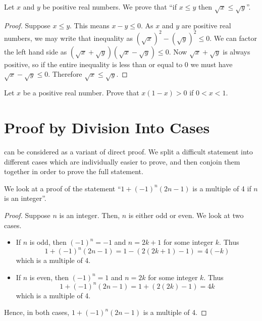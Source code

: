 \begin{example}
    Let $x$ and $y$ be positive real numbers. We prove that ``if $x \leq y$ then $\sqrt x \leq \sqrt y$''.
    \begin{proof}
        Suppose $x \leq y$. This means $x - y \leq 0$. As $x$ and $y$ are positive real numbers, we may write that inequality as $(\sqrt x)^2 - (\sqrt y)^2 \leq 0$. We can factor the left hand side as $(\sqrt x + \sqrt y)(\sqrt x - \sqrt y) \leq 0$. Now $\sqrt x + \sqrt y$ is always positive, so if the entire inequality is less than or equal to 0 we must have $\sqrt x - \sqrt y \leq 0$. Therefore $\sqrt x \leq \sqrt y$.
    \end{proof}
\end{example}

\begin{exercise}
    Let $x$ be a positive real number. Prove that $x(1-x) > 0$ if $0 < x < 1$.
\end{exercise}

\section{Proof by Division Into Cases}
 can be considered as a variant of direct proof. We split a difficult statement into different cases which are individually easier to prove, and then conjoin them together in order to prove the full statement.
\begin{example}
    We look at a proof of the statement ``$1 + (-1)^n(2n-1)$ is a multiple of 4 if $n$ is an integer''.
    \begin{proof}
        Suppose $n$ is an integer. Then, $n$ is either odd or even. We look at two cases.
        \begin{itemize}
            \item If $n$ is odd, then $(-1)^n = -1$ and $n = 2k+1$ for some integer $k$. Thus
            \[
                1 + (-1)^n(2n-1) = 1 - (2(2k+1)-1) = 4(-k)
            \]
            which is a multiple of 4.
            \item If $n$ is even, then $(-1)^n = 1$ and $n = 2k$ for some integer $k$. Thus
            \[
                1 + (-1)^n(2n-1) = 1 + (2(2k)-1) = 4k
            \]
            which is a multiple of 4.
        \end{itemize}
        Hence, in both cases, $1 + (-1)^n(2n-1)$ is a multiple of 4.
    \end{proof}
\end{example}

